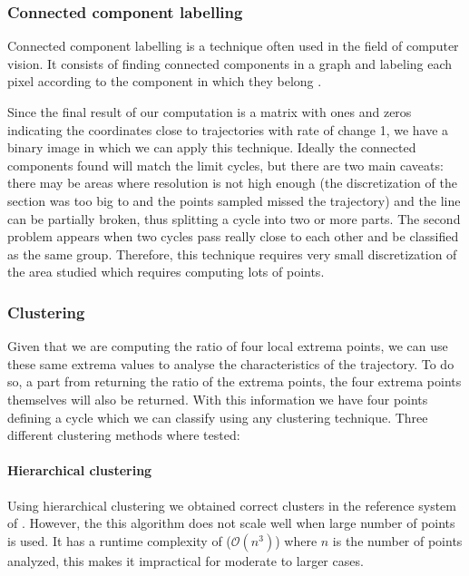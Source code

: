 \subsubsection*{Connected component labelling}

Connected component labelling is a technique often used in the field of computer vision. It consists of finding connected components in a graph and labeling each pixel according to the component in which they belong \cite{shapiro_connected_1996}.

Since the final result of our computation is a matrix with ones and zeros indicating the coordinates close to trajectories with rate of change 1, we have a binary image in which we can apply this technique. Ideally the connected components found will match the limit cycles, but there are two main caveats: there may be areas where resolution is not high enough (the discretization of the section was too big to and the points sampled missed the trajectory) and the line can be partially broken, thus splitting a cycle into two or more parts. The second problem appears when two cycles pass really close to each other and be classified as the same group. Therefore, this technique requires very small discretization of the area studied which requires computing lots of points.

\subsubsection*{Clustering}
Given that we are computing the ratio of four local extrema points, we can use these same extrema values to analyse the characteristics of the trajectory. To do so, a part from returning the ratio of the extrema points, the four extrema points themselves will also be returned. With this information we have four points defining a cycle which we can classify using any clustering technique. Three different clustering methods where tested:

\paragraph{Hierarchical clustering}

Using hierarchical clustering we obtained correct clusters in the reference system of \cite{kuznetsov_visualization_2013}. However, the this algorithm does not scale well when large number of points is used. It has a runtime complexity of ($\mathcal{O}(n^3)$) where $n$ is the number of points analyzed, this makes it
impractical for moderate to larger cases.

